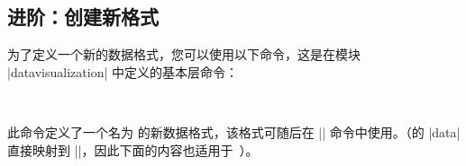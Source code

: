 \subsection{进阶：创建新格式}
\label{section-dv-declaring-formats}


为了定义一个新的数据格式，您可以使用以下命令，这是在模块 |datavisualization| 中定义的基本层命令：

\newlength{\length}
\settowidth{\length}{pgfdeclaredataformat}
\begin{command}{\pgfdeclaredataformat\parbox[t]{0.7\textwidth}{\\\hspace{\length}}} %

    此命令定义了一个名为  的新数据格式，该格式可随后在 |\pgfdata| 命令中使用。（\tikzname 的 |data| 直接映射到 |\pgfdata|，因此下面的内容也适用于\tikzname\ ）。



\end{command}
